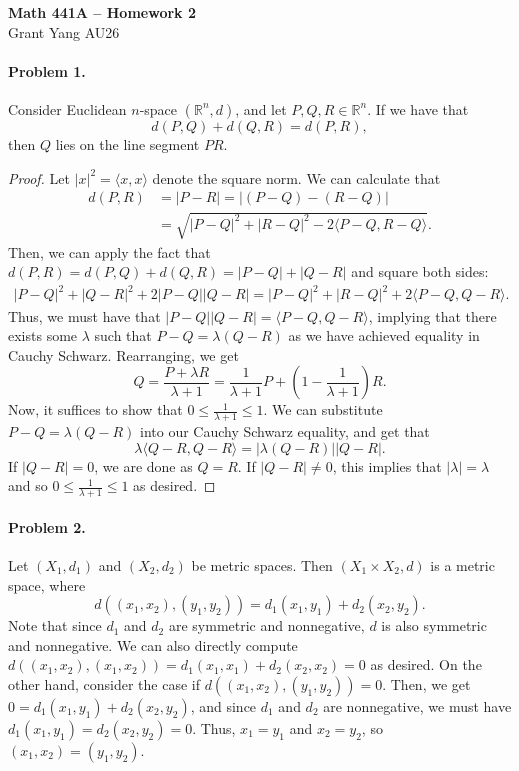 \documentclass[12pt]{article}
\begin{document}
\begin{center} {\large \textbf{Math 441A -- Homework 2}} \smallskip \\ 
    Grant Yang \hspace{1em} AU26
 \end{center}

\paragraph{Problem 1.} Consider Euclidean $n$-space $(\mathbb R^n, d)$, and let $P, Q, R \in \mathbb R^n$. If we have that \begin{equation}d(P, Q) + d(Q, R) = d(P, R), \label{p1} \end{equation} then $Q$ lies on the line segment $PR$.

\begin{proof}
    Let $|x|^2 = \langle x, x \rangle$ denote the square norm. We can calculate that
    \begin{align*}
        d(P, R) &= |P - R| = |(P - Q) - (R - Q)| \\
        &= \sqrt{|P - Q|^2 + |R - Q|^2 - 2 \langle P - Q, R - Q \rangle}.
    \end{align*}
    Then, we can apply the fact that $d(P, R) = d(P, Q) + d(Q, R) = |P - Q| + |Q - R|$ and square both sides:
    \begin{align*}
        |P-Q|^2 + |Q - R|^2 + 2|P-Q| |Q - R| = |P-Q|^2 + |R-Q|^2 + 2 \langle P - Q, Q - R \rangle.
    \end{align*}
    Thus, we must have that $|P - Q||Q - R| = \langle P - Q, Q - R \rangle$, implying that there exists some $\lambda$ such that $P - Q = \lambda (Q - R)$ as we have achieved equality in Cauchy Schwarz. Rearranging, we get \[Q = \frac{P + \lambda R}{\lambda + 1} = \frac{1}{\lambda + 1} P + \left(1 - \frac{1}{\lambda + 1}\right)R.\]
    Now, it suffices to show that $0 \le \frac{1}{\lambda + 1} \le 1$. We can substitute $P - Q = \lambda (Q - R)$ into our Cauchy Schwarz equality, and get that
    \[\lambda \langle Q - R, Q - R\rangle = |\lambda (Q - R)| |Q - R|.\]
    If $|Q-R| = 0$, we are done as $Q = R$. If $|Q-R|\neq 0$, this implies that $|\lambda| = \lambda$ and so $0 \le \frac{1}{\lambda + 1} \le 1$ as desired.
\end{proof}

\newpage{}
\paragraph{Problem 2.}
Let $(X_1, d_1)$ and $(X_2, d_2)$ be metric spaces. Then $(X_1 \times X_2, d)$ is a metric space, where 
\[ d((x_1, x_2), (y_1, y_2)) = d_1(x_1, y_1) + d_2(x_2, y_2).\]
Note that since $d_1$ and $d_2$ are symmetric and nonnegative, $d$ is also symmetric and nonnegative. We can also directly compute $d((x_1, x_2), (x_1, x_2)) = d_1(x_1, x_1) + d_2(x_2, x_2) = 0$ as desired. On the other hand, consider the case if $d((x_1, x_2), (y_1, y_2)) = 0$. Then, we get $0 = d_1(x_1, y_1) + d_2(x_2, y_2)$, and since $d_1$ and $d_2$ are nonnegative, we must have $d_1(x_1, y_1) = d_2(x_2, y_2) = 0$. Thus, $x_1 = y_1$ and $x_2 = y_2$, so $(x_1, x_2) = (y_1, y_2)$. 
\end{document}
